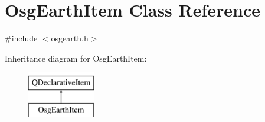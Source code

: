 \hypertarget{class_osg_earth_item}{\section{Osg\-Earth\-Item Class Reference}
\label{class_osg_earth_item}
}


{\ttfamily \#include $<$osgearth.\-h$>$}

Inheritance diagram for Osg\-Earth\-Item\-:\begin{figure}[H]
\begin{center}
\leavevmode
\includegraphics[height=2.000000cm]{class_osg_earth_item}
\end{center}
\end{figure}
